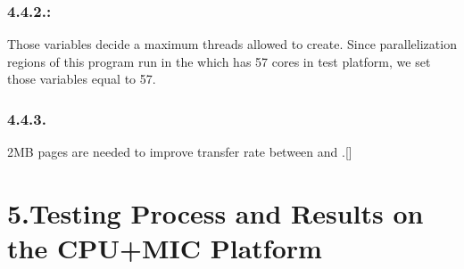 \documentclass{article}
\begin{document}
\subsubsection{4.4.2.\hspace*{0.5em}:}\label{sec-mkl_num_threads57-omp_num_threads57-}%

\noindent{}Those variables decide a maximum threads allowed to create. Since parallelization regions of this program run in the  which has 57 cores in test platform, we set those variables equal to 57.%

\subsubsection{4.4.3.\hspace*{0.5em}}\label{sec-mic_use_2mb_buffers64k}%

\noindent{}2MB pages are needed to improve transfer rate between  and .[]%

\section{5.\hspace*{0.5em}Testing Process and Results on the CPU+MIC Platform}\label{sec-testing-process-and-results-on-the-cpumic-platform}%
\end{document}
